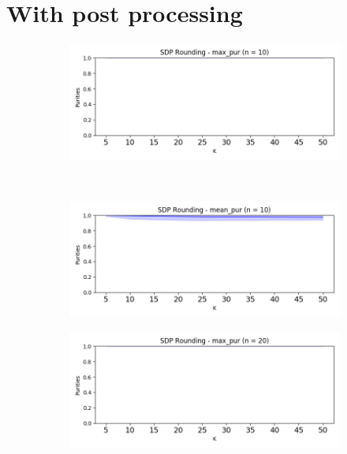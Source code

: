\documentclass{article}
\begin{document}
\section{With post processing}
    \begin{figure}[h!]
        \centering
        \begin{subfigure}[t]{0.5\textwidth}
            \centering
            \includegraphics[width=\textwidth]{max_pur_10n_true}
            \caption{}
        \end{subfigure}%
        ~ 
        \begin{subfigure}[t]{0.5\textwidth}
            \centering
            \includegraphics[width=\textwidth]{mean_pur_10n_true}
            \caption{}
        \end{subfigure}
        \begin{subfigure}[t]{0.5\textwidth}
            \centering
            \includegraphics[width=\textwidth]{max_pur_20n_true}

\end{subfigure}
\end{figure}
\end{document}
